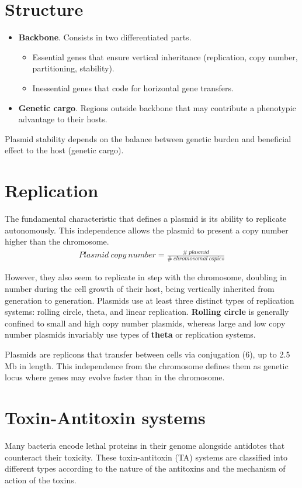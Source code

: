 \section{Structure}
\begin{itemize}
    \item \textbf{Backbone}. Consists in two differentiated parts.
    \begin{itemize}
        \item Essential genes that ensure vertical inheritance (replication, copy number, partitioning, stability).
        \item Inessential genes that code for horizontal gene transfers.
    \end{itemize}
    \item \textbf{Genetic cargo}. Regions outside backbone that may contribute a phenotypic advantage to their hosts. 
\end{itemize}
Plasmid stability depends on the balance between genetic burden and beneficial effect to the host (genetic cargo).

\section{Replication}
The fundamental characteristic that defines a plasmid is its ability to replicate autonomously. This independence allows 
the plasmid to present a copy number higher than the chromosome. 
\begin{align*}
    Plasmid\ copy\ number = \frac{\#\ plasmid}{\#\ chromosomal\ copies} 
\end{align*}

However, they also seem to replicate in step with the chromosome, doubling in number during the cell growth of their host, 
being vertically inherited from generation to generation. Plasmids use at least three distinct types of replication systems: 
rolling circle, theta, and linear replication. \textbf{Rolling circle} is generally confined to small and high copy number 
plasmids, whereas large and low copy number plasmids invariably use types of \textbf{theta} or  replication systems. 

Plasmids are replicons that transfer between cells via conjugation (6), up to 2.5 Mb in length. This independence from the 
chromosome defines them as genetic locus where genes may evolve faster than in the chromosome.

\section{Toxin-Antitoxin systems}
Many bacteria encode lethal proteins in their genome alongside antidotes that counteract their toxicity. These toxin-antitoxin (TA) 
systems are classified into different types according to the nature of the antitoxins and the mechanism of action of the toxins.

